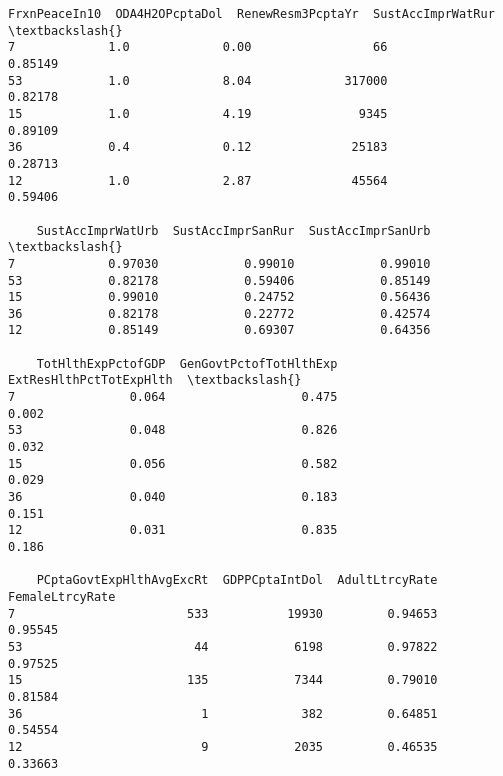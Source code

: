 \documentclass[11pt]{article}
\begin{document}
    \begin{Verbatim}[commandchars=\\\{\}]
    FrxnPeaceIn10  ODA4H2OPcptaDol  RenewResm3PcptaYr  SustAccImprWatRur  \textbackslash{}
7             1.0             0.00                 66            0.85149   
53            1.0             8.04             317000            0.82178   
15            1.0             4.19               9345            0.89109   
36            0.4             0.12              25183            0.28713   
12            1.0             2.87              45564            0.59406   

    SustAccImprWatUrb  SustAccImprSanRur  SustAccImprSanUrb  \textbackslash{}
7             0.97030            0.99010            0.99010   
53            0.82178            0.59406            0.85149   
15            0.99010            0.24752            0.56436   
36            0.82178            0.22772            0.42574   
12            0.85149            0.69307            0.64356   

    TotHlthExpPctofGDP  GenGovtPctofTotHlthExp  ExtResHlthPctTotExpHlth  \textbackslash{}
7                0.064                   0.475                    0.002   
53               0.048                   0.826                    0.032   
15               0.056                   0.582                    0.029   
36               0.040                   0.183                    0.151   
12               0.031                   0.835                    0.186   

    PCptaGovtExpHlthAvgExcRt  GDPPCptaIntDol  AdultLtrcyRate  FemaleLtrcyRate  
7                        533           19930         0.94653          0.95545  
53                        44            6198         0.97822          0.97525  
15                       135            7344         0.79010          0.81584  
36                         1             382         0.64851          0.54554  
12                         9            2035         0.46535          0.33663  

    \end{Verbatim}
\end{document}
